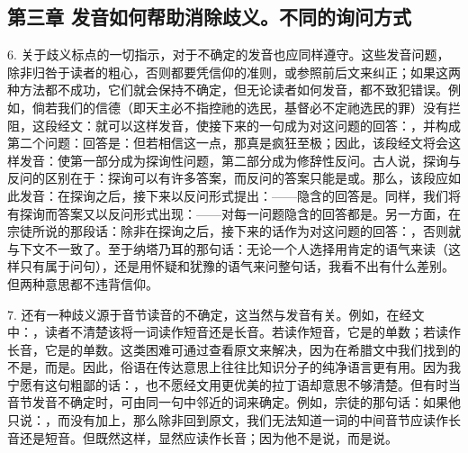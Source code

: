 
\subsection{第三章  发音如何帮助消除歧义。不同的询问方式}

6. 关于歧义标点的一切指示，对于不确定的发音也应同样遵守。这些发音问题，除非归咎于读者的粗心，否则都要凭信仰的准则，或参照前后文来纠正；如果这两种方法都不成功，它们就会保持不确定，但无论读者如何发音，都不致犯错误。例如，倘若我们的信德（即天主必不指控祂的选民，基督必不定祂选民的罪）没有拦阻，这段经文：就可以这样发音，使接下来的一句成为对这问题的回答：，并构成第二个问题：回答是：但若相信这一点，那真是疯狂至极；因此，该段经文将会这样发音：使第一部分成为探询性问题，第二部分成为修辞性反问。古人说，探询与反问的区别在于：探询可以有许多答案，而反问的答案只能是或。那么，该段应如此发音：在探询之后，接下来以反问形式提出：——隐含的回答是。同样，我们将有探询而答案又以反问形式出现：——对每一问题隐含的回答都是。另一方面，在宗徒所说的那段话：除非在探询之后，接下来的话作为对这问题的回答：，否则就与下文不一致了。至于纳塔乃耳的那句话：无论一个人选择用肯定的语气来读（这样只有属于问句），还是用怀疑和犹豫的语气来问整句话，我看不出有什么差别。但两种意思都不违背信仰。\par

7. 还有一种歧义源于音节读音的不确定，这当然与发音有关。例如，在经文中：，读者不清楚该将一词读作短音还是长音。若读作短音，它是的单数；若读作长音，它是的单数。这类困难可通过查看原文来解决，因为在希腊文中我们找到的不是，而是。因此，俗语在传达意思上往往比知识分子的纯净语言更有用。因为我宁愿有这句粗鄙的话：，也不愿经文用更优美的拉丁语却意思不够清楚。但有时当音节发音不确定时，可由同一句中邻近的词来确定。例如，宗徒的那句话：如果他只说：，而没有加上，那么除非回到原文，我们无法知道一词的中间音节应读作长音还是短音。但既然这样，显然应读作长音；因为他不是说，而是说。\par

